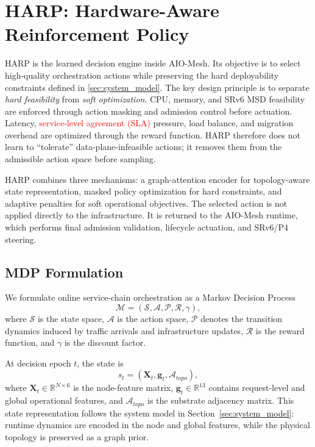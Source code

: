 \documentclass[final,5p]{elsarticle}
\newcommand{\rev}[1]{\textcolor{red}{#1}}
\begin{document}
\section{HARP: Hardware-Aware Reinforcement Policy}
\label{sec:harp}

HARP is the learned decision engine inside AIO-Mesh. Its objective is to select high-quality orchestration actions while preserving the hard deployability constraints defined in \autoref{sec:system_model}. The key design principle is to separate \emph{hard feasibility} from \emph{soft optimization}. CPU, memory, and SRv6 MSD feasibility are enforced through action masking and admission control before actuation. Latency, \rev{service-level agreement (SLA)} pressure, load balance, and migration overhead are optimized through the reward function. HARP therefore does not learn to ``tolerate'' data-plane-infeasible actions; it removes them from the admissible action space before sampling.

HARP combines three mechanisms: a graph-attention encoder for topology-aware state representation, masked policy optimization for hard constraints, and adaptive penalties for soft operational objectives. The selected action is not applied directly to the infrastructure. It is returned to the AIO-Mesh runtime, which performs final admission validation, lifecycle actuation, and SRv6/P4 steering.

\subsection{MDP Formulation}
\label{subsec:harp_mdp}

We formulate online service-chain orchestration as a Markov Decision Process
\begin{equation}
    \mathcal{M}=(\mathcal{S},\mathcal{A},\mathcal{P},\mathcal{R},\gamma),
\end{equation}
where \(\mathcal{S}\) is the state space, \(\mathcal{A}\) is the action space, \(\mathcal{P}\) denotes the transition dynamics induced by traffic arrivals and infrastructure updates, \(\mathcal{R}\) is the reward function, and \(\gamma\) is the discount factor.

At decision epoch \(t\), the state is
\begin{equation}
    s_t=(\mathbf{X}_t,\mathbf{g}_t,\mathcal{A}_{topo}),
\end{equation}
where \(\mathbf{X}_t\in\mathbb{R}^{N\times 6}\) is the node-feature matrix, \(\mathbf{g}_t\in\mathbb{R}^{13}\) contains request-level and global operational features, and \(\mathcal{A}_{topo}\) is the substrate adjacency matrix. This state representation follows the system model in Section~\ref{sec:system_model}: runtime dynamics are encoded in the node and global features, while the physical topology is preserved as a graph prior.
\end{document}
